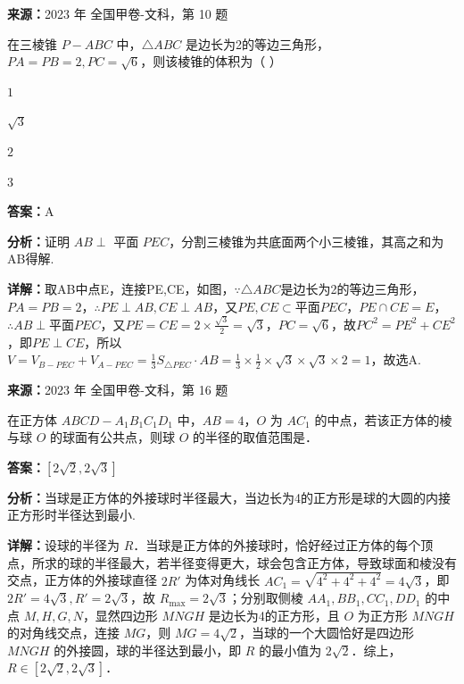 \begin{question}[points=5]
\textbf{来源：}2023 年 全国甲卷-文科，第 10 题\par
在三棱锥 $P-ABC$ 中，$\triangle ABC$ 是边长为2的等边三角形，$PA=PB=2, PC=\sqrt{6}$，则该棱锥的体积为（    ）
\begin{choices}
  \item $1$
  \item $\sqrt{3}$
  \item $2$
  \item $3$
\end{choices}
\begin{solution}
\textbf{答案：}A

\textbf{分析：}证明 $AB \perp$ 平面 $PEC$，分割三棱锥为共底面两个小三棱锥，其高之和为AB得解.

\textbf{详解：}取AB中点E，连接PE,CE，如图，$\because \triangle ABC$是边长为2的等边三角形，$PA=PB=2$，$\therefore PE \perp AB, CE \perp AB$，又$PE, CE \subset$平面$PEC$，$PE \cap CE = E$，$\therefore AB \perp$平面$PEC$，又$PE=CE=2\times\frac{\sqrt{3}}{2}=\sqrt{3}$，$PC=\sqrt{6}$，故$PC^2=PE^2+CE^2$，即$PE \perp CE$，所以$V=V_{B-PEC}+V_{A-PEC}=\frac{1}{3}S_{\triangle PEC}\cdot AB = \frac{1}{3}\times\frac{1}{2}\times\sqrt{3}\times\sqrt{3}\times2=1$，故选A.
\end{solution}
\end{question}

\begin{question}[points=5]
\textbf{来源：}2023 年 全国甲卷-文科，第 16 题\par
在正方体 $ABCD-A_1B_1C_1D_1$ 中，$AB=4$，$O$ 为 $AC_1$ 的中点，若该正方体的棱与球 $O$ 的球面有公共点，则球 $O$ 的半径的取值范围是．
\begin{solution}
\textbf{答案：}$[2\sqrt{2}, 2\sqrt{3}]$

\textbf{分析：}当球是正方体的外接球时半径最大，当边长为4的正方形是球的大圆的内接正方形时半径达到最小.

\textbf{详解：}设球的半径为 $R$．当球是正方体的外接球时，恰好经过正方体的每个顶点，所求的球的半径最大，若半径变得更大，球会包含正方体，导致球面和棱没有交点，正方体的外接球直径 $2R'$ 为体对角线长 $AC_1=\sqrt{4^2+4^2+4^2}=4\sqrt{3}$，即 $2R'=4\sqrt{3}, R'=2\sqrt{3}$，故 $R_{\max}=2\sqrt{3}$；分别取侧棱 $AA_1, BB_1, CC_1, DD_1$ 的中点 $M,H,G,N$，显然四边形 $MNGH$ 是边长为4的正方形，且 $O$ 为正方形 $MNGH$ 的对角线交点，连接 $MG$，则 $MG=4\sqrt{2}$，当球的一个大圆恰好是四边形 $MNGH$ 的外接圆，球的半径达到最小，即 $R$ 的最小值为 $2\sqrt{2}$．综上，$R\in[2\sqrt{2},2\sqrt{3}]$．
\end{solution}
\end{question}

